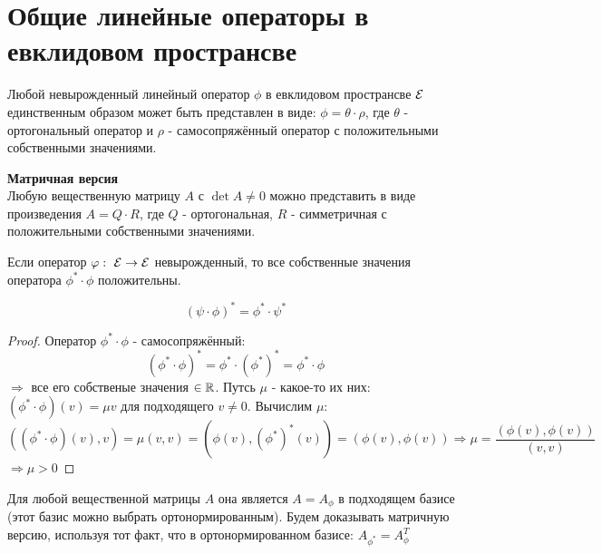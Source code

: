 \section{Общие линейные операторы в евклидовом пространсве}
\begin{theorem}
    Любой невырожденный линейный оператор $\phi$ в евклидовом пространсве $\mathcal{E}$ единственным образом может быть представлен в виде: $\phi = \theta \cdot \rho$, где $\theta$ - ортогональный оператор и $\rho$ - самосопряжённый оператор с положительными собственными значениями. 
\end{theorem}
\begin{theorem} \textbf{Матричная версия}\\
    Любую вещественную матрицу $A$ с $\det A \neq 0$ можно представить в виде произведения $A = Q \cdot R$, где $Q$ - ортогональная, $R$ - симметричная с положительными собственными значениями.      
\end{theorem}
\begin{lemma}
    Если оператор $\varphi: \ \mathcal{E} \to \mathcal{E}$ невырожденный, то все собственные значения оператора $\phi^* \cdot \phi$ положительны.  
\end{lemma} 
\begin{subtheorem}
    $$(\psi \cdot \phi)^* = \phi^* \cdot \psi^*$$ 
\end{subtheorem} 
\begin{proof}
    Оператор $\phi^* \cdot \phi$ - самосопряжённый: 
    $$(\phi^* \cdot \phi)^* = \phi^* \cdot (\phi^*)^* = \phi^* \cdot \phi$$
    $\Longrightarrow $ все его собственые значения $\in \mathbb{R}$. Путсь $\mu$ - какое-то их них: $(\phi^* \cdot \phi)(v) = \mu v$ для подходящего $v \neq 0$. Вычислим $\mu$: 
    $$((\phi^* \cdot \phi)(v),v) = \mu(v,v) = (\phi(v),(\phi^*)^*(v)) = (\phi(v), \phi(v)) \Longrightarrow \mu = \frac{(\phi(v),\phi(v))}{(v,v)}$$
    $\Longrightarrow \mu>0$     
\end{proof} 
\begin{remark}
    Для любой вещественной матрицы $A$ она является $A = A_\phi$ в подходящем базисе (этот базис можно выбрать ортонормированным). Будем доказывать матричную версию, используя тот факт, что в ортонормированном базисе: $A_{\phi^*} = A_\phi^T$  
\end{remark}
